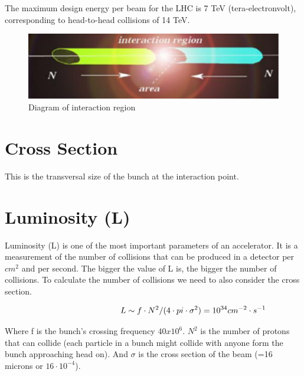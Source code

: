 \noindent
The maximum design energy per beam for the LHC is 7 TeV (tera-electronvolt), corresponding to head-to-head collisions of 14 TeV.

\;
\;
\;

\begin{figure}[h]
\centering\includegraphics[scale=1.0]{./Particleaccelerators/Pictures/fig3.pdf}
\caption{Diagram of interaction region}
\label{fig:acc3}
\end{figure}

\;
\;


\section{Cross Section}


\noindent
This is the transversal size of the bunch at the interaction point.

\;
\;

\section{Luminosity (L)}


\noindent
Luminosity (L) is one of the most important parameters of an accelerator. It is a measurement of the number of collisions that can be produced in a detector per $cm^{2}$ and per second. The bigger the value of L is, the bigger the number of collisions. To calculate the number of collisions we need to also consider the cross section.

\begin{equation}\hspace{34 mm}L\sim f\cdot N^{2}/(4\cdot pi\cdot  \sigma ^{2}) = 10^{34} cm^{-2} \cdot s^{-1} \end{equation}

\;
\;

\noindent
Where f is the bunch's crossing frequency $40x10^{6}$. $N^{2}$ is the number of protons that can collide (each particle in a bunch might collide with anyone form the bunch approaching head on). And $\sigma$ is the cross section of the beam (=16 microns or $16\cdot 10^{-4}$).

